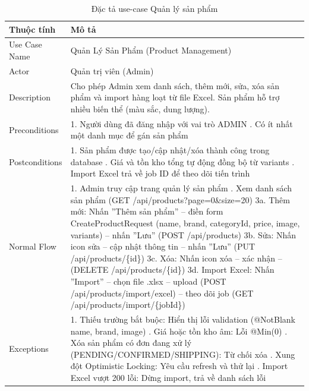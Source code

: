 \begin{table}[H]
\centering
\begin{tabular}{|l|p{11cm}|}
\hline
\textbf{Thuộc tính} & \textbf{Mô tả} \\
\hline
Use Case Name & Quản Lý Sản Phẩm (Product Management) \\
\hline
Actor & Quản trị viên (Admin) \\
\hline
Description & Cho phép Admin xem danh sách, thêm mới, sửa, xóa sản phẩm và import hàng loạt từ file Excel. Sản phẩm hỗ trợ nhiều biến thể (màu sắc, dung lượng). \\
\hline
Preconditions & 1. Người dùng đã đăng nhập với vai trò ADMIN \newline 2. Có ít nhất một danh mục để gán sản phẩm \\
\hline
Postconditions & 1. Sản phẩm được tạo/cập nhật/xóa thành công trong database \newline 2. Giá và tồn kho tổng tự động đồng bộ từ variants \newline 3. Import Excel trả về job ID để theo dõi tiến trình \\
\hline
Normal Flow & 1. Admin truy cập trang quản lý sản phẩm \newline 2. Xem danh sách sản phẩm (GET /api/products?page=0\&size=20) \newline 3a. Thêm mới: Nhấn ''Thêm sản phẩm'' -- điền form CreateProductRequest (name, brand, categoryId, price, image, variants) -- nhấn ''Lưu'' (POST /api/products) \newline 3b. Sửa: Nhấn icon sửa -- cập nhật thông tin -- nhấn ''Lưu'' (PUT /api/products/\{id\}) \newline 3c. Xóa: Nhấn icon xóa -- xác nhận -- (DELETE /api/products/\{id\}) \newline 3d. Import Excel: Nhấn ''Import'' -- chọn file .xlsx -- upload (POST /api/products/import/excel) -- theo dõi job (GET /api/products/import/\{jobId\}) \\
\hline
Exceptions & 1. Thiếu trường bắt buộc: Hiển thị lỗi validation (@NotBlank name, brand, image) \newline 2. Giá hoặc tồn kho âm: Lỗi @Min(0) \newline 3. Xóa sản phẩm có đơn đang xử lý (PENDING/CONFIRMED/SHIPPING): Từ chối xóa \newline 4. Xung đột Optimistic Locking: Yêu cầu refresh và thử lại \newline 5. Import Excel vượt 200 lỗi: Dừng import, trả về danh sách lỗi \\
\hline
\end{tabular}
\caption{Đặc tả use-case Quản lý sản phẩm}
\label{tab:uc012}
\end{table}

